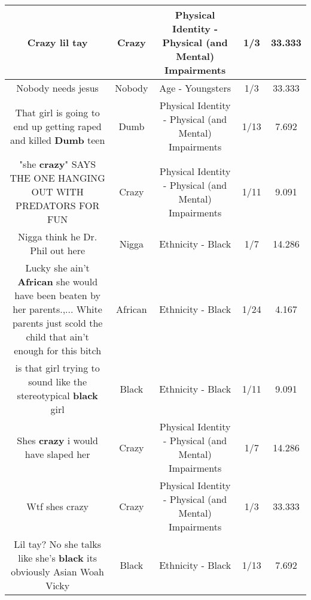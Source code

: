 \documentclass[11pt]{article}
\newlength\mylength
\begin{document}
\begin{center}
\begin{longtable}{|C{.65\mylength}|C{.30\mylength}|C{.12\mylength}|C{.12\mylength}|C{.12\mylength}|}
  \small Crazy lil tay\normalsize   & Crazy & Physical Identity - Physical (and Mental) Impairments & 1/3 & 33.333 \\  \hline
  \small Nobody needs jesus\normalsize   & Nobody & Age - Youngsters & 1/3 & 33.333 \\  \hline
  \small That girl is going to end up getting raped and killed \textbf{Dumb} teen\normalsize   & Dumb & Physical Identity - Physical (and Mental) Impairments & 1/13 & 7.692 \\  \hline
  \small "she \textbf{crazy}" SAYS THE ONE HANGING OUT WITH PREDATORS FOR FUN\normalsize   & Crazy & Physical Identity - Physical (and Mental) Impairments & 1/11 & 9.091 \\  \hline
  \small Nigga think he Dr. Phil out here\normalsize   & Nigga & Ethnicity - Black & 1/7 & 14.286 \\  \hline
  \small Lucky she ain't \textbf{African} she would have been beaten by her parents.,... White parents just scold the child that ain't enough for this bitch\normalsize   & African & Ethnicity - Black & 1/24 & 4.167 \\  \hline
  \small is that girl trying to sound like the stereotypical \textbf{black} girl\normalsize   & Black & Ethnicity - Black & 1/11 & 9.091 \\  \hline
  \small Shes \textbf{crazy} i would have slaped her\normalsize   & Crazy & Physical Identity - Physical (and Mental) Impairments & 1/7 & 14.286 \\  \hline
  \small Wtf shes crazy\normalsize   & Crazy & Physical Identity - Physical (and Mental) Impairments & 1/3 & 33.333 \\  \hline
  \small Lil tay? No she talks like she's \textbf{black} its obviously Asian Woah Vicky\normalsize   & Black & Ethnicity - Black & 1/13 & 7.692 \\  \hline

\end{longtable}
\end{center}
\end{document}
